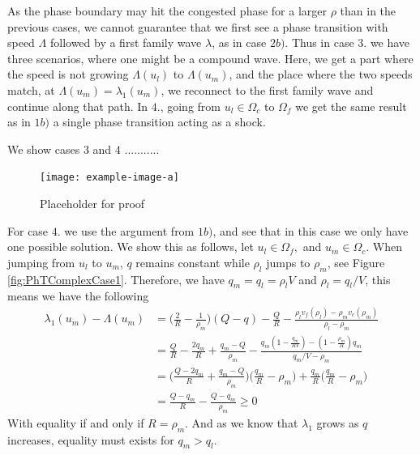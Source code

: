 \documentclass[10pt]{article}
\numberwithin{equation}{section}
\begin{document}
As the phase boundary may hit the congested phase for a larger $\rho$ than in the previous cases, we cannot guarantee that we first see a phase transition with speed $\Lambda$ followed by a first family wave $\lambda$, as in case $2b)$. Thus in case $3.$ we have three scenarios, where one might be a compound wave. Here, we get a part where the speed is not growing $\Lambda(u_l)$ to $\Lambda(u_m)$, and the place where the two speeds match, at $\Lambda(u_m) = \lambda_1(u_m)$, we reconnect to the first family wave and continue along that path. In $4.$, going from $u_l \in \Omega_c$ to $\Omega_f$ we get the same result as in $1b)$ a single phase transition acting as a shock. 
 
We show cases $3$ and $4$ ........... 
\begin{figure}[H]
    \centering
    \texttt{[image: example-image-a]}
    \caption{Placeholder for proof}
    \label{fig:sampleDhehehhe}
\end{figure}

\vspace{50pt}

For case $4.$ we use the argument from $1b)$, and see that in this case we only have one possible solution.
We show this as follows, let $u_l \in \Omega_f,$ and $u_m \in \Omega_c$. When jumping from $u_l$ to $u_m$, $q$ remains constant while $\rho_l$ jumps to $\rho_m$, see Figure \ref{fig:PhTComplexCase1}. Therefore, we have $q_m = q_l = \rho_l V$ and $\rho_l = q_l/V$, this means we have the following 
\begin{align*}
    \lambda_1(u_m) - \Lambda(u_m) &= \bigg(\frac{2}{R} - \frac{1}{\rho_m} \bigg)(Q-q) - \frac{Q}{R} - \frac{\rho_l v_f(\rho_l) - \rho_m v_c(\rho_m)}{\rho_l - \rho_m} \\
    &= \frac{Q}{R} - \frac{2q_m}{R} + \frac{q_m-Q}{\rho_m} -  \frac{q_m (1 - \frac{q_m}{RV}) - (1- \frac{\rho_m}{R})q_m }{q_m/V - \rho_m} \\
    &= \bigg( \frac{Q-2q_m}{R} + \frac{q_m-Q}{\rho_m} \bigg) \bigg( \frac{q_m}{R} - \rho_m \bigg) + \frac{q_m}{R} \bigg( \frac{q_m}{R} - \rho_m \bigg) \\
    &= \frac{Q-q_m}{R} - \frac{Q-q_m}{\rho_m} \geq 0
\end{align*}
 With equality if and only if $R = \rho_m$. And as we know that $\lambda_1$ grows as $q$ increases, equality must exists for $q_m > q_l$. 
\end{document}
